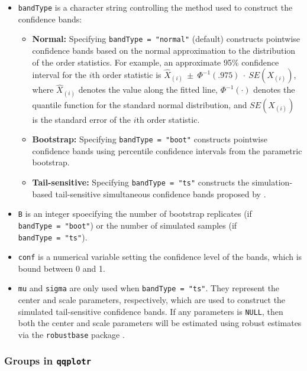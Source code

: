 \begin{itemize}
\item
  \texttt{bandType} is a character string controlling the method used to
  construct the confidence bands:

  \begin{itemize}
  \tightlist
  \item
    \textbf{Normal:} Specifying \texttt{bandType\ =\ "normal"} (default)
    constructs pointwise confidence bands based on the normal
    approximation to the distribution of the order statistics. For
    example, an approximate 95\% confidence interval for the \(i\)th
    order statistic is
    \linebreak \(\widehat{X}_{(i)}~\pm~\Phi^{-1}(.975)~\cdot~SE(X_{(i)})\),
    where \(\widehat{X}_{(i)}\) denotes the value along the fitted line,
    \(\Phi^{-1}(\cdot)\) denotes the quantile function for the standard
    normal distribution, and \(SE(X_{(i)})\) is the standard error of
    the \(i\)th order statistic.
  \item
    \textbf{Bootstrap:} Specifying \texttt{bandType\ =\ "boot"}
    constructs pointwise confidence bands using percentile confidence
    intervals from the parametric bootstrap.
  \item
    \textbf{Tail-sensitive:} Specifying \texttt{bandType\ =\ "ts"}
    constructs the simulation-based tail-sensitive simultaneous
    confidence bands proposed by \citet{Aldor-Noiman2013-xw}.
  \end{itemize}
\item
  \texttt{B} is an integer spoecifying the number of bootstrap
  replicates (if \texttt{bandType\ =\ "boot"}) or the number of
  simulated samples (if \texttt{bandType\ =\ "ts"}).
\item
  \texttt{conf} is a numerical variable setting the confidence level of
  the bands, which is bound between 0 and 1.
\item
  \texttt{mu} and \texttt{sigma} are only used when
  \texttt{bandType\ =\ "ts"}. They represent the center and scale
  parameters, respectively, which are used to construct the simulated
  tail-sensitive confidence bands. If any parameters is \texttt{NULL},
  then both the center and scale parameters will be estimated using
  robust estimates via the \texttt{robustbase} package
  \citep{robustbase}.
\end{itemize}

\subsubsection{\texorpdfstring{Groups in
\texttt{qqplotr}}{Groups in qqplotr}}\label{groups-in-qqplotr}

